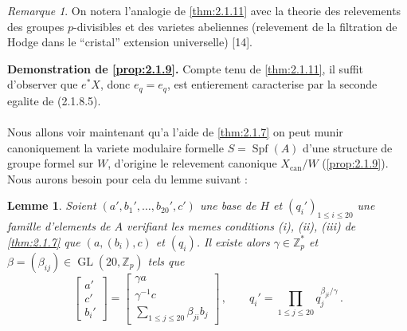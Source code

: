 \documentclass[12pt,a4paper]{article}
\theoremstyle{plain}
\newtheorem{lemma}[theorem]{Lemme}
\theoremstyle{definition}
\theoremstyle{remark}
\newtheorem{remark}[theorem]{Remarque}
\DeclareMathOperator{\Spf}{Spf}
\DeclareMathOperator{\GL}{GL}
\begin{document}
\begin{remark}\label{rem:2.1.12}
On notera l'analogie de \ref{thm:2.1.11} avec la theorie des relevements des groupes $p$-divisibles et des varietes abeliennes (relevement de la filtration de Hodge dans le ``cristal'' extension universelle) [14].
\end{remark}

\textbf{Demonstration de \ref{prop:2.1.9}.} Compte tenu de \ref{thm:2.1.11}, il suffit d'observer que $e^*X$, donc $e_q = e_q$, est entierement caracterise par la seconde egalite de (2.1.8.5).

\paragraph{}

Nous allons voir maintenant qu'a l'aide de \ref{thm:2.1.7} on peut munir canoniquement la variete modulaire formelle $S = \Spf(A)$ d'une structure de groupe formel sur $W$, d'origine le relevement canonique $X_{\mathrm{can}}/W$ (\ref{prop:2.1.9}). Nous aurons besoin pour cela du lemme suivant :

\begin{lemma}\label{lem:2.1.13}
Soient $(a', b_1', \ldots, b_{20}', c')$ une base de $H$ et $(q_i')_{1 \leq i \leq 20}$ une famille d'elements de $A$ verifiant les memes conditions (i), (ii), (iii) de \ref{thm:2.1.7} que $(a, (b_i), c)$ et $(q_i)$. Il existe alors $\gamma \in \mathbb{Z}_p^*$ et $\beta = (\beta_{ij}) \in \GL(20, \mathbb{Z}_p)$ tels que
\begin{equation}\label{eq:2.1.13.1}
\begin{bmatrix} a' \\ c' \\ b_i' \end{bmatrix} = \begin{bmatrix} \gamma a \\ \gamma^{-1}c \\ \sum_{1 \leq j \leq 20} \beta_{ji} b_j \end{bmatrix}\,, \qquad q_i' = \prod_{1 \leq j \leq 20} q_j^{\beta_{ji}/\gamma}\,.\end{equation}
\end{lemma}
\end{document}
